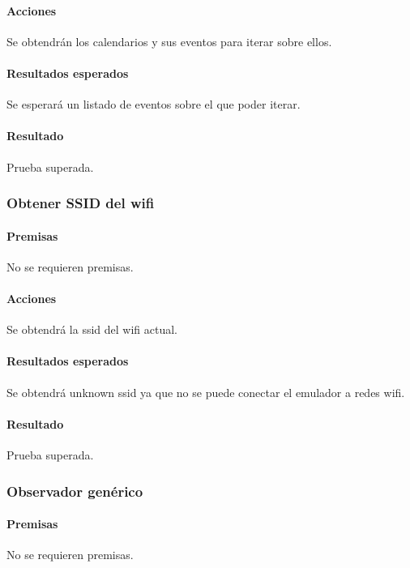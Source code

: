 \paragraph{Acciones}
Se obtendrán los calendarios y sus eventos para iterar sobre ellos.

\paragraph{Resultados esperados}
Se esperará un listado de eventos sobre el que poder iterar.

\paragraph{Resultado}
Prueba superada.


\subsubsection{Obtener SSID del wifi}

\paragraph{Premisas}
No se requieren premisas.

\paragraph{Acciones}
Se obtendrá la ssid del wifi actual.

\paragraph{Resultados esperados}
Se obtendrá unknown ssid ya que no se puede conectar el emulador a redes wifi.

\paragraph{Resultado}
Prueba superada.

\subsubsection{Observador genérico}

\paragraph{Premisas}
No se requieren premisas.

